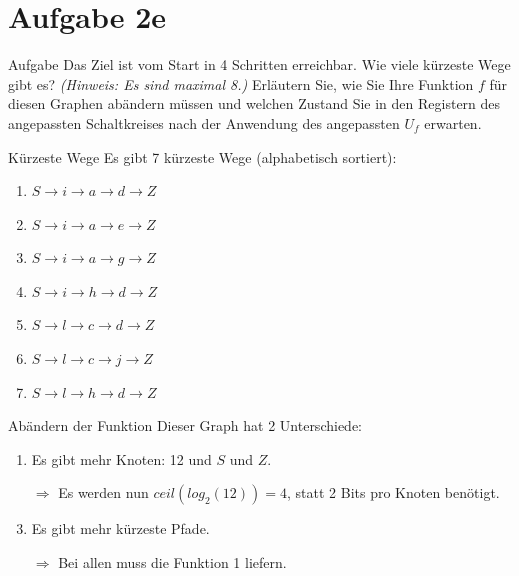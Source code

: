 \documentclass[fleqn,compress,utf8,aspectratio=169,t]{beamer}
\begin{document}
\section{Aufgabe 2e}

\begin{frame}{Aufgabe}
Das Ziel ist vom Start in 4 Schritten erreichbar. Wie viele kürzeste Wege gibt es? \textit{(Hinweis: Es sind maximal 8.)} Erläutern Sie, wie Sie Ihre Funktion $f$ für diesen Graphen abändern müssen und welchen Zustand Sie in den Registern des angepassten Schaltkreises nach der Anwendung des angepassten $U_f$ erwarten.
\end{frame}

\begin{frame}{Kürzeste Wege}
Es gibt 7 kürzeste Wege (alphabetisch sortiert):
\begin{enumerate}
	\item $S \rightarrow i \rightarrow a \rightarrow d \rightarrow Z$
	\item $S \rightarrow i \rightarrow a \rightarrow e \rightarrow Z$
	\item $S \rightarrow i \rightarrow a \rightarrow g \rightarrow Z$
	\item $S \rightarrow i \rightarrow h \rightarrow d \rightarrow Z$
	\item $S \rightarrow l \rightarrow c \rightarrow d \rightarrow Z$
	\item $S \rightarrow l \rightarrow c \rightarrow j \rightarrow Z$
	\item $S \rightarrow l \rightarrow h \rightarrow d \rightarrow Z$
\end{enumerate}
\end{frame}

\begin{frame}{Abändern der Funktion}
Dieser Graph hat 2 Unterschiede:
\begin{enumerate}
	\item Es gibt mehr Knoten: 12 und $S$ und $Z$.
	\item[$\Rightarrow$] Es werden nun $ceil(log_2(12)) = 4$, statt 2 Bits pro Knoten benötigt.
	\item Es gibt mehr kürzeste Pfade.
	\item[$\Rightarrow$] Bei allen muss die Funktion 1 liefern.
\end{enumerate}
\end{frame}
\end{document}
